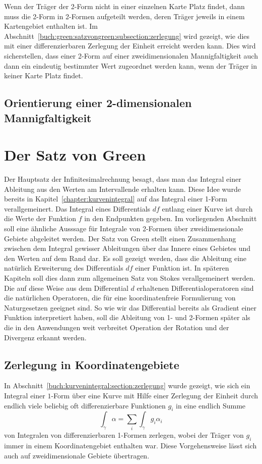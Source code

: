 Wenn der Träger der 2-Form nicht in einer einzelnen Karte Platz
findet, dann muss die 2-Form in 2-Formen aufgeteilt werden, deren
Träger jeweils in einem Kartengebiet enthalten ist.
Im Abschnitt~\ref{buch:green:satzvongreen:subsection:zerlegung}
wird gezeigt, wie dies mit einer differenzierbaren Zerlegung
der Einheit erreicht werden kann.
Dies wird sicherstellen, dass einer 2-Form auf einer
zweidimensionalen Mannigfaltigkeit auch dann ein eindeutig bestimmter
Wert zugeordnet werden kann, wenn der Träger in keiner Karte Platz
findet.

%
%
\subsection{Orientierung einer 2-dimensionalen Mannigfaltigkeit}

%
%
\section{Der Satz von Green
\label{buch:green:section:green}}
Der Hauptsatz der Infinitesimalrechnung besagt, dass man das Integral
einer Ableitung aus den Werten am Intervallende erhalten kann.
Diese Idee wurde bereits in Kapitel~\ref{chapter:kurvenintegral} auf
das Integral einer 1-Form verallgemeinert.
Das Integral eines Differentials $df$ entlang einer Kurve ist durch
die Werte der Funktion $f$ in den Endpunkten gegeben.
Im vorliegenden Abschnitt soll eine ähnliche Ausssage für Integrale
von 2-Formen über zweidimensionale Gebiete abgeleitet werden.
Der Satz von Green stellt einen Zusammenhang zwischen dem Integral
gewisser Ableitungen über das Innere eines Gebietes und den Werten
auf dem Rand dar.
Es soll gezeigt werden, dass die Ableitung eine natürlich Erweiterung
des Differentials $df$ einer Funktion ist.
In späteren Kapiteln soll dies dann zum allgemeinen Satz von Stokes
verallgemeinert werden.
Die auf diese Weise aus dem Differential $d$ erhaltenen
Differentialoperatoren sind die natürlichen Operatoren, die für
eine koordinatenfreie Formulierung von Naturgesetzen geeignet sind.
So wie wir das Differential bereits als Gradient einer Funktion
interpretiert haben, soll die Ableitung von 1- und 2-Formen später
als die in den Anwendungen weit verbreitet Operation der Rotation
und der Divergenz erkannt werden.

%
%
\subsection{Zerlegung in Koordinatengebiete
\label{buch:green:satzvongreen:subsection:zerlegung}}
In Abschnitt~\ref{buch:kurvenintegral:section:zerlegung} wurde gezeigt,
wie sich ein Integral einer $1$-Form über eine Kurve mit Hilfe einer
Zerlegung der Einheit durch endlich viele beliebig oft differenzierbare
Funktionen $g_i$ in eine endlich Summe
\[
\int_{\gamma} \alpha = \sum_i \int_{\gamma} g_i\alpha_i
\]
von Integralen von differenzierbaren 1-Formen zerlegen, wobei der
Träger von $g_i$ immer in einem Koordinatengebiet enthalten war.
Diese Vorgehensweise lässt sich auch auf zweidimensionale Gebiete
übertragen.

